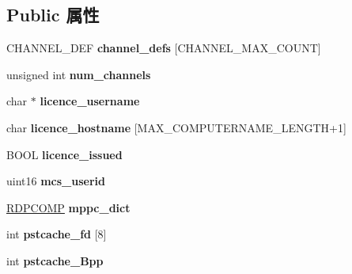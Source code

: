 \subsection*{Public 属性}
\begin{DoxyCompactItemize}
\item 
\mbox{\label{structrdpclient_a3c138b7f9fb0ef09d020a910205a648b}} 
C\+H\+A\+N\+N\+E\+L\+\_\+\+D\+EF {\bfseries channel\+\_\+defs} \mbox{[}C\+H\+A\+N\+N\+E\+L\+\_\+\+M\+A\+X\+\_\+\+C\+O\+U\+NT\mbox{]}
\item 
\mbox{\label{structrdpclient_a335103fc5fc7d492199969dff781d9f1}} 
unsigned int {\bfseries num\+\_\+channels}
\item 
\mbox{\label{structrdpclient_a76e602e9bf9e28564c2113d81f2f1f6a}} 
char $\ast$ {\bfseries licence\+\_\+username}
\item 
\mbox{\label{structrdpclient_a99479af0277f95393a133fb21c4e9cf1}} 
char {\bfseries licence\+\_\+hostname} \mbox{[}M\+A\+X\+\_\+\+C\+O\+M\+P\+U\+T\+E\+R\+N\+A\+M\+E\+\_\+\+L\+E\+N\+G\+TH+1\mbox{]}
\item 
\mbox{\label{structrdpclient_a455a2cf0e93f1f855d97ecc0cd286832}} 
B\+O\+OL {\bfseries licence\+\_\+issued}
\item 
\mbox{\label{structrdpclient_a42a01eac947ba45ed81b902ae6b92cac}} 
uint16 {\bfseries mcs\+\_\+userid}
\item 
\mbox{\label{structrdpclient_a6be32308dba0128c0d1f65cbd7a2bb13}} 
\hyperlink{struct___r_d_p_c_o_m_p}{R\+D\+P\+C\+O\+MP} {\bfseries mppc\+\_\+dict}
\item 
\mbox{\label{structrdpclient_a0c647a280154d1d16b479935fa13cba8}} 
int {\bfseries pstcache\+\_\+fd} \mbox{[}8\mbox{]}
\item 
\mbox{\label{structrdpclient_a981e2553ba9349e39982370270d14b74}} 
int {\bfseries pstcache\+\_\+\+Bpp}
\item 
\mbox{\label{structrdpclient_a785b4a57eeba6203414813d8f6d11140}} 

\end{DoxyCompactItemize}
